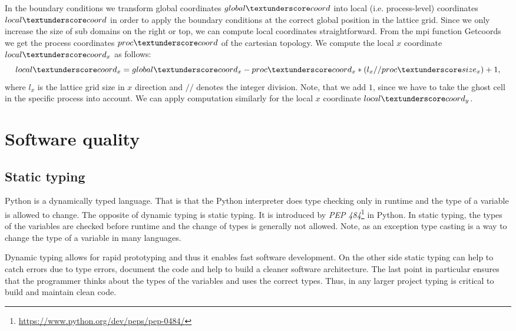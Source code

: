 \documentclass[a4paper,11pt, footsepline]{book}
\begin{document}
In the boundary conditions we transform global coordinates $global\textunderscore coord$ into local (i.e. process-level) coordinates $local\textunderscore coord$ in order to apply the boundary conditions at the correct global position in the lattice grid. Since we only increase the size of sub domains on the right or top, we can compute local coordinates straightforward. From the \ac{mpi} function \textsf{Get\textunderscore coords} we get the process coordinates $proc\textunderscore coord$ of the cartesian topology. We compute the local $x$ coordinate $local\textunderscore coord_{x}$ as follows:
\begin{equation}
local\textunderscore coord_{x}=global\textunderscore coord_{x}-proc\textunderscore coord_{x}*(l_{x}//proc\textunderscore size_{x}) +1,
\end{equation}
where $l_{x}$ is the lattice grid size in $x$ direction and $//$ denotes the integer division. Note, that we add $1$, since we have to take the ghost cell in the specific process into account. We can apply computation similarly for the local $x$ coordinate $local\textunderscore coord_{y}$.
\section{Software quality}
\subsection*{Static typing}
Python is a dynamically typed language. That is that the Python interpreter does type checking only in runtime and the type of a variable is allowed to change. The opposite of dynamic typing is static typing. It is introduced by \textit{PEP 484}\footnote{\url{https://www.python.org/dev/peps/pep-0484/}} in Python. In static typing, the types of the variables are checked before runtime and the change of types is generally not allowed. Note, as an exception type casting is a way to change the type of a variable in many languages.

Dynamic typing allows for rapid prototyping and thus it enables fast software development. On the other side static typing can help to catch errors due to type errors, document the code and help to build a cleaner software architecture. The last point in particular ensures that the programmer thinks about the types of the variables and uses the correct types. Thus, in any larger project typing is critical to build and maintain clean code.
\end{document}
